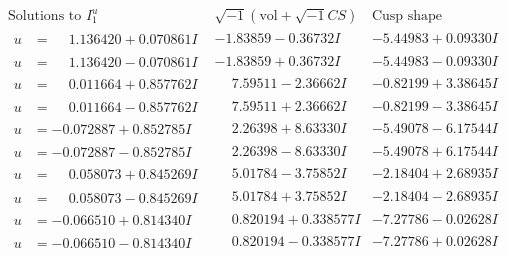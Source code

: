 \documentclass[1p]{elsarticle_modified}
\theoremstyle{definition}
\newcommand{\I}{\sqrt{-1}}
\begin{document}
$$\begin{array}{c|c|c}  
\text{Solutions to }I^u_{1}& \I (\text{vol} + \sqrt{-1}CS) & \text{Cusp shape}\\
 \hline 
\begin{aligned}
u &= \phantom{-}1.136420 + 0.070861 I\end{aligned}
 & -1.83859 - 0.36732 I & -5.44983 + 0.09330 I \\ \hline\begin{aligned}
u &= \phantom{-}1.136420 - 0.070861 I\end{aligned}
 & -1.83859 + 0.36732 I & -5.44983 - 0.09330 I \\ \hline\begin{aligned}
u &= \phantom{-}0.011664 + 0.857762 I\end{aligned}
 & \phantom{-}7.59511 - 2.36662 I & -0.82199 + 3.38645 I \\ \hline\begin{aligned}
u &= \phantom{-}0.011664 - 0.857762 I\end{aligned}
 & \phantom{-}7.59511 + 2.36662 I & -0.82199 - 3.38645 I \\ \hline\begin{aligned}
u &= -0.072887 + 0.852785 I\end{aligned}
 & \phantom{-}2.26398 + 8.63330 I & -5.49078 - 6.17544 I \\ \hline\begin{aligned}
u &= -0.072887 - 0.852785 I\end{aligned}
 & \phantom{-}2.26398 - 8.63330 I & -5.49078 + 6.17544 I \\ \hline\begin{aligned}
u &= \phantom{-}0.058073 + 0.845269 I\end{aligned}
 & \phantom{-}5.01784 - 3.75852 I & -2.18404 + 2.68935 I \\ \hline\begin{aligned}
u &= \phantom{-}0.058073 - 0.845269 I\end{aligned}
 & \phantom{-}5.01784 + 3.75852 I & -2.18404 - 2.68935 I \\ \hline\begin{aligned}
u &= -0.066510 + 0.814340 I\end{aligned}
 & \phantom{-}0.820194 + 0.338577 I & -7.27786 - 0.02628 I \\ \hline\begin{aligned}
u &= -0.066510 - 0.814340 I\end{aligned}
 & \phantom{-}0.820194 - 0.338577 I & -7.27786 + 0.02628 I \\ \hline\begin{aligned}

\end{aligned}
\end{array}$$
\end{document}
